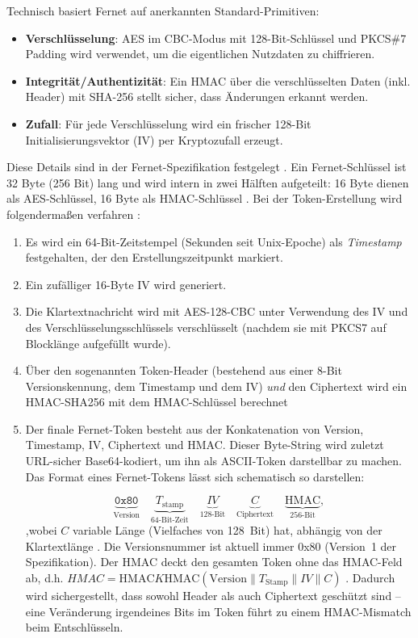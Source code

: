 Technisch basiert Fernet auf anerkannten Standard-Primitiven: \begin{itemize}\setlength\itemsep{0pt} \item \textbf{Verschlüsselung}: AES im CBC-Modus mit 128-Bit-Schlüssel und PKCS\#7 Padding wird verwendet, um die eigentlichen Nutzdaten zu chiffrieren. \item \textbf{Integrität/Authentizität}: Ein HMAC über die verschlüsselten Daten (inkl. Header) mit SHA-256 stellt sicher, dass Änderungen erkannt werden. \item \textbf{Zufall}: Für jede Verschlüsselung wird ein frischer 128-Bit Initialisierungsvektor (IV) per Kryptozufall erzeugt. \end{itemize} Diese Details sind in der Fernet-Spezifikation festgelegt \cite{FernetSpec}. Ein Fernet-Schlüssel ist 32 Byte (256 Bit) lang und wird intern in zwei Hälften aufgeteilt: 16 Byte dienen als AES-Schlüssel, 16 Byte als HMAC-Schlüssel \cite{FernetSpec}. Bei der Token-Erstellung wird folgendermaßen verfahren \cite{FernetSpec}:
\begin{enumerate}
    \item Es wird ein 64-Bit-Zeitstempel (Sekunden seit Unix-Epoche) als \textit{Timestamp} festgehalten, der den Erstellungszeitpunkt markiert.
    \item Ein zufälliger 16-Byte IV wird generiert.
    \item Die Klartextnachricht wird mit AES-128-CBC unter Verwendung des IV und des Verschlüsselungsschlüssels verschlüsselt (nachdem sie mit PKCS7 auf Blocklänge aufgefüllt wurde).
    \item Über den sogenannten Token-Header (bestehend aus einer 8-Bit Versionskennung, dem Timestamp und dem IV) \textit{und} den Ciphertext wird ein HMAC-SHA256 mit dem HMAC-Schlüssel berechnet
    \item  Der finale Fernet-Token besteht aus der Konkatenation von Version, Timestamp, IV, Ciphertext und HMAC. Dieser Byte-String wird zuletzt URL-sicher Base64-kodiert, um ihn als ASCII-Token darstellbar zu machen. Das Format eines Fernet-Tokens lässt sich schematisch so darstellen: 


\[
\underbrace{\texttt{0x80}}_{\text{Version}} 
\quad
\underbrace{T_{\text{stamp}}}_{\text{64-Bit-Zeit}} 
\quad
\underbrace{IV}_{\text{128-Bit}} 
\quad
\underbrace{C}_{\text{Ciphertext}} 
\quad
\underbrace{\mathrm{HMAC}}_{\text{256-Bit}},
\]
,wobei $C$ variable Länge (Vielfaches von 128 Bit) hat, abhängig von der Klartextlänge \cite{FernetSpec}. Die Versionsnummer ist aktuell immer 0x80 (Version 1 der Spezifikation). Der HMAC deckt den gesamten Token ohne das HMAC-Feld ab, d.h. $HMAC = \mathrm{HMAC}{K{\text{HMAC}}}(\text{Version} \parallel T_{\text{Stamp}} \parallel IV \parallel C)$ \cite{FernetSpec}. Dadurch wird sichergestellt, dass sowohl Header als auch Ciphertext geschützt sind – eine Veränderung irgendeines Bits im Token führt zu einem HMAC-Mismatch beim Entschlüsseln.
\end{enumerate}

